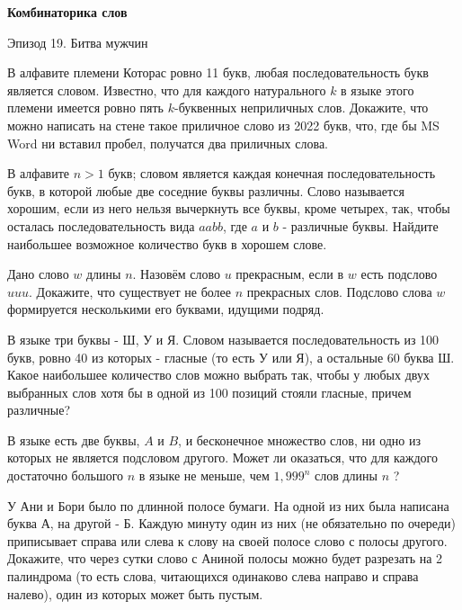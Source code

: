 \centerline{\bf \Huge Комбинаторика слов}

\begin{flushright}
        \scriptsize{Эпизод 19. Битва мужчин}
\end{flushright}

В алфавите племени Которас ровно 11 букв, любая последовательность букв является словом. Известно, что для каждого натурального $k$ в языке этого племени имеется ровно пять $k$-буквенных неприличных слов. Докажите, что можно написать на стене такое приличное слово из 2022 букв, что, где бы MS Word ни вставил пробел, получатся два приличных слова.

В алфавите $n>1$ букв; словом является каждая конечная последовательность букв, в которой любые две соседние буквы различны. Слово называется хорошим, если из него нельзя вычеркнуть все буквы, кроме четырех, так, чтобы осталась последовательность вида $a a b b$, где $a$ и $b$ - различные буквы. Найдите наибольшее возможное количество букв в хорошем слове.

Дано слово $w$ длины $n$. Назовём слово $u$ прекрасным, если в $w$ есть подслово $u u u$. Докажите, что существует не более $n$ прекрасных слов. Подслово слова $w$ формируется несколькими его буквами, идущими подряд.

В языке три буквы - Ш, У и Я. Словом называется последовательность из 100 букв, ровно 40 из которых - гласные (то есть У или Я), а остальные 60 буква Ш. Какое наибольшее количество слов можно выбрать так, чтобы у любых двух выбранных слов хотя бы в одной из 100 позиций стояли гласные, причем различные?

В языке есть две буквы, $A$ и $B$, и бесконечное множество слов, ни одно из которых не является подсловом другого. Может ли оказаться, что для каждого достаточно большого $n$ в языке не меньше, чем $1,999^n$ слов длины $n$ ?

У Ани и Бори было по длинной полосе бумаги. На одной из них была написана буква А, на другой - Б. Каждую минуту один из них (не обязательно по очереди) приписывает справа или слева к слову на своей полосе слово с полосы другого. Докажите, что через сутки слово с Аниной полосы можно будет разрезать на 2 палиндрома (то есть слова, читающихся одинаково слева направо и справа налево), один из которых может быть пустым.